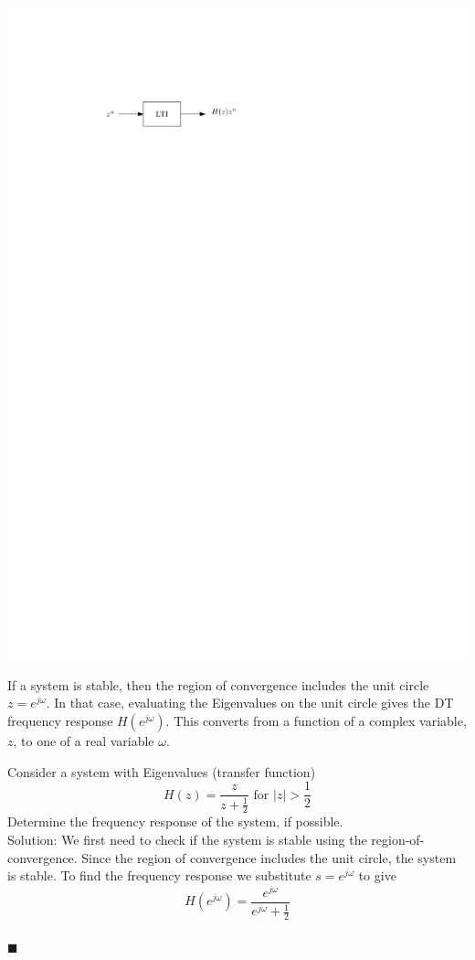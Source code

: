 \begin{center}
  \includegraphics[scale=1]{graphics/19-dt-tf.pdf}
\end{center}

If a system is stable, then the region of convergence includes the unit circle $z = e^{j\omega}$. In that case, evaluating the Eigenvalues on the unit circle gives the DT frequency response $H\left(e^{j\omega}\right)$. This converts from a function of a complex variable, $z$, to one of a real variable $\omega$.

\begin{example} Consider a system with Eigenvalues (transfer function)
  \[
  H(z) = \frac{z}{z+\tfrac{1}{2}}\mbox{ for } |z| > \frac{1}{2}
  \]
  Determine the frequency response of the system, if possible.\\

  Solution: We first need to check if the system is stable using the region-of-convergence. Since the region of convergence includes the unit circle, the system is stable. To find the frequency response we substitute $s = e^{j\omega}$ to give
  \[
  H\left(e^{j\omega}\right) = \frac{e^{j\omega}}{e^{j\omega} + \tfrac{1}{2}}
  \]
  \\$\blacksquare$
\end{example}

